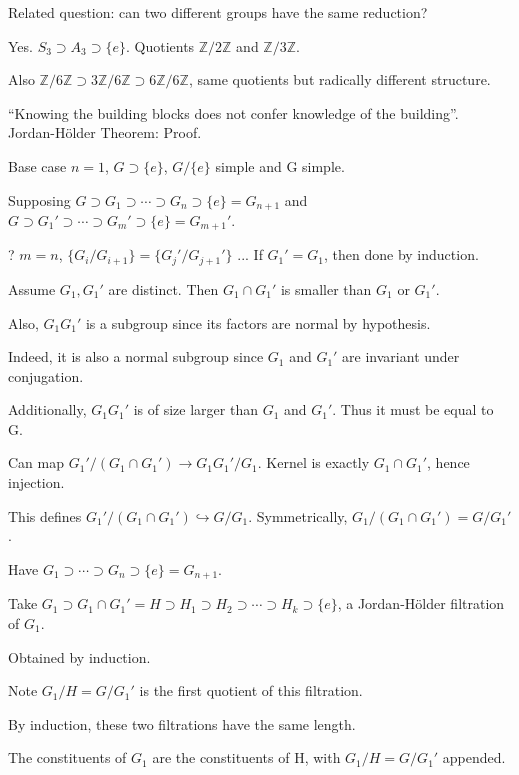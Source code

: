 \documentclass[12pt]{article}
\begin{document}
\noindent
Related question: can two different groups have the same reduction?

Yes.  $S_3 \supset A_3 \supset \{e\}.$ Quotients $\mathds{Z}/2\mathds{Z}$ and $\mathds{Z}/3\mathds{Z}$.

Also $\mathds{Z}/6\mathds{Z} \supset 3\mathds{Z}/6\mathds{Z} \supset 6\mathds{Z}/6\mathds{Z}$, same quotients but radically different structure.

``Knowing the building blocks does not confer knowledge of the building''.\\

\noindent
Jordan-H\"{o}lder Theorem: Proof.

Base case $n = 1$, $G \supset \{e\}$, $G/\{e\}$ simple and G simple.

Supposing $G \supset G_1 \supset \cdots \supset G_n \supset \{e\} = G_{n + 1}$ and $G \supset G_1' \supset \cdots \supset G_m' \supset \{e\} = G_{m + 1}'$.

? $m = n$, $\{G_i / G_{i + 1}\} = \{G_j'/G_{j + 1}'\}$ ... If $G_1' = G_1$, then done by induction.

Assume $G_1, G_1'$ are distinct.  Then $G_1 \cap G_1'$ is smaller than $G_1$ or $G_1'$.

Also, $G_1G_1'$ is a subgroup since its factors are normal by hypothesis.

Indeed, it is also a normal subgroup since $G_1$ and $G_1'$ are invariant under conjugation.

Additionally, $G_1G_1'$ is of size larger than $G_1$ and $G_1'$.  Thus it must be equal to G.

Can map $G_1'/(G_1 \cap G_1') \to G_1G_1'/G_1$.  Kernel is exactly $G_1 \cap G_1'$, hence injection.

This defines $G_1'/(G_1 \cap G_1') \hookrightarrow G/G_1$.  Symmetrically, $G_1/(G_1 \cap G_1') = G/G_1'$.

Have $G_1 \supset \cdots \supset G_n \supset \{e\} = G_{n + 1}$.

Take $G_1 \supset G_1 \cap G_1' = H \supset H_1 \supset H_2 \supset \cdots \supset H_k \supset \{e\}$, a Jordan-H\"{o}lder filtration of $G_1$.

Obtained by induction.

Note $G_1/H = G/G_1'$ is the first quotient of this filtration.

By induction, these two filtrations have the same length.

The constituents of $G_1$ are the constituents of H, with $G_1/H = G/G_1'$ appended.
\end{document}

